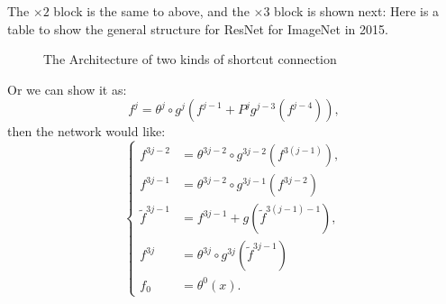 The $\times 2$ block is the same to above, and the $\times 3$ block is shown next:
Here is a table to show the general structure for ResNet for ImageNet in 2015.
\begin{figure}[!htb]
	\caption{The Architecture of two kinds of shortcut connection}      
	\label{LeNet-5}
\end{figure}
Or we can show it as:
\begin{equation}
f^j = \theta^j \circ g^j(f^{j-1} + P^jg^{j-3}(f^{j-4}) ),
\end{equation}
then the network would like:
\begin{equation}
\begin{cases}
f^{3j-2} &= \theta^{3j-2} \circ g^{3j-2}(f^{3(j-1)}), \\
f^{3j-1} &= \theta^{3j-2} \circ g^{3j-1}({f}^{3j-2}) \\
\tilde{f}^{3j-1} &= f^{3j-1} + g(\tilde f^{3(j-1)-1}), \\
f^{3j} &= \theta^{3j}\circ g^{3j}(\tilde f^{3j-1}) \\
f_0 &= \theta^0(x).
\end{cases} 
\end{equation}

